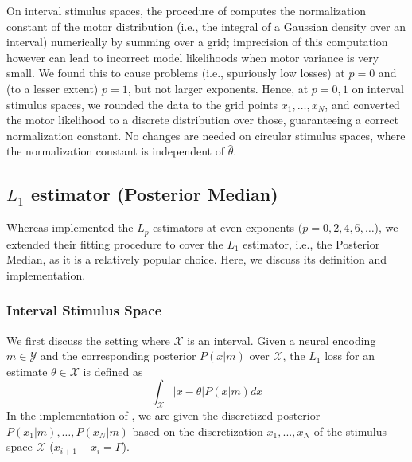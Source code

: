 On interval stimulus spaces, the procedure of \citet{hahn2024unifying} computes the normalization constant of the motor distribution (i.e., the integral of a Gaussian density over an interval) numerically by summing over a grid; imprecision of this computation however can lead to incorrect model likelihoods when motor variance is very small. We found this to cause problems (i.e., spuriously low losses) at $p=0$ and (to a lesser extent) $p=1$, but not larger exponents. Hence, at $p=0,1$ on interval stimulus spaces, we rounded the data to the grid points $x_1, \dots, x_N$, and converted the motor likelihood to a discrete distribution over those, guaranteeing a correct normalization constant. No changes are needed on circular stimulus spaces, where the normalization constant is independent of $\widehat{\theta}$.



\subsection{$L_1$ estimator (Posterior Median)}\label{sec:median}

Whereas \citet{hahn2024unifying} implemented the $L_p$ estimators at even exponents ($p=0,2,4,6,\dots$), we extended their fitting procedure  to cover the $L_1$ estimator, i.e., the Posterior Median, as it is a relatively popular choice.
Here, we discuss its definition and implementation.


\subsubsection*{Interval Stimulus Space}
We first discuss the setting where $\mathcal{X}$ is an interval.
Given a neural encoding $m \in \mathcal{Y}$ and the corresponding posterior $P(x|m)$ over $\mathcal{X}$, the $L_1$ loss for an estimate $\theta \in \mathcal{X}$ is defined as
\begin{equation}\label{eq:l1-loss}
    \int_{\mathcal{X}} |x-\theta| P(x|m) dx
\end{equation}
In the implementation of \citet{hahn2024unifying}, we are given the discretized posterior $P(x_1|m), \dots, P(x_N|m)$ based on the discretization $x_1, ..., x_N$ of the stimulus space $\mathcal{X}$ ($x_{i+1}-x_i = \Gamma$).






